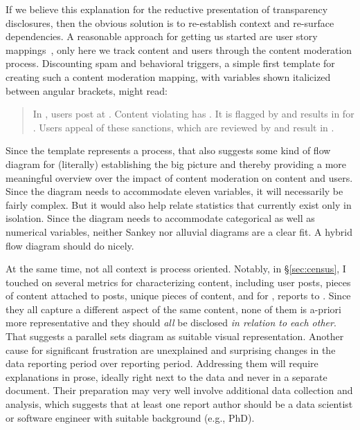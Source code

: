 If we believe this explanation for the reductive presentation of transparency
disclosures, then the obvious solution is to re-establish context and re-surface
dependencies. A reasonable approach for getting us started are user story
mappings~\cite{PattonEconomy2014}, only here we track content and users through
the content moderation process. Discounting spam and behavioral triggers, a
simple first template for creating such a content moderation mapping, with
variables shown italicized between angular brackets, might read:
\begin{quote}
In , users post  at . Content violating
 has . It is flagged by  and
results in  for . Users appeal 
of these sanctions, which are reviewed by  and result in
.
\end{quote}
Since the template represents a process, that also suggests some kind of flow
diagram for (literally) establishing the big picture and thereby providing a
more meaningful overview over the impact of content moderation on content and
users. Since the diagram needs to accommodate eleven variables, it will
necessarily be fairly complex. But it would also help relate statistics that
currently exist only in isolation. Since the diagram needs to accommodate
categorical as well as numerical variables, neither Sankey nor alluvial diagrams
are a clear fit. A hybrid flow diagram should do nicely.

At the same time, not all context is process oriented. Notably, in
\S\ref{sec:census}, I touched on several metrics for characterizing content,
including user posts, pieces of content attached to posts, unique pieces of
content, and for , reports to . Since they all capture a different
aspect of the same content, none of them is a-priori more representative and
they should \emph{all} be disclosed \emph{in relation to each other}. That
suggests a parallel sets diagram as suitable visual representation. Another
cause for significant frustration are unexplained and surprising changes in the
data reporting period over reporting period. Addressing them will require
explanations in prose, ideally right next to the data and never in a separate
document. Their preparation may very well involve additional data collection and
analysis, which suggests that at least one report author should be a data
scientist or software engineer with suitable background (e.g., PhD).


